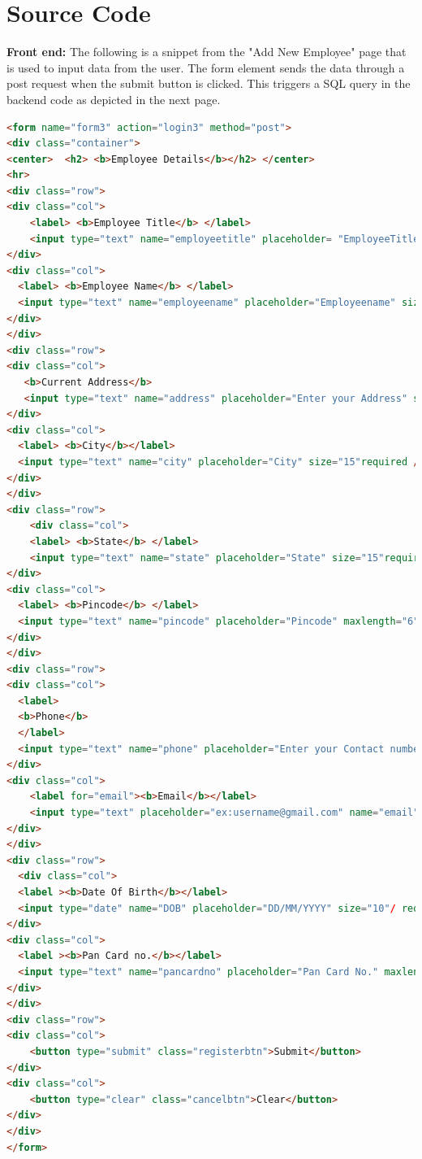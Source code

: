 \documentclass[12pt]{article}
\begin{document}
\section{Source Code}               %
\textbf{Front end:}
\noindent
\newline
The following is a snippet from the "Add New Employee" page that is used to input data from the user. The form element sends the data through a post request when the submit button is clicked. This triggers a SQL query in the backend code as depicted in the next page.
\begin{lstlisting}[language = html]
<form name="form3" action="login3" method="post">  
<div class="container">  
<center>  <h2> <b>Employee Details</b></h2> </center>  
<hr> 
<div class="row">
<div class="col">
    <label> <b>Employee Title</b> </label>   
    <input type="text" name="employeetitle" placeholder= "EmployeeTitle" size="15" required />
</div>
<div class="col">
  <label> <b>Employee Name</b> </label>   
  <input type="text" name="employeename" placeholder="Employeename" size="15" required />   
</div>
</div>
<div class="row">
<div class="col">
   <b>Current Address</b>
   <input type="text" name="address" placeholder="Enter your Address" style="width: 500px;height: 150px;" / required/></input>
</div>
<div class="col">
  <label> <b>City</b></label>    
  <input type="text" name="city" placeholder="City" size="15"required />   
</div>
</div>
<div class="row">
    <div class="col">
    <label> <b>State</b> </label>    
    <input type="text" name="state" placeholder="State" size="15"required /> 
</div>
<div class="col">
  <label> <b>Pincode</b> </label>    
  <input type="text" name="pincode" placeholder="Pincode" maxlength="6" pattern="\d{6}" title="Please enter exactly 7 digits" / required >  
</div>
</div>
<div class="row">
<div class="col">
  <label>   
  <b>Phone</b>  
  </label>  
  <input type="text" name="phone" placeholder="Enter your Contact number"  maxlength="10" pattern="\d{10}" title="Please enter exactly 10 digits" / required>   
</div>
<div class="col">
    <label for="email"><b>Email</b></label>  
    <input type="text" placeholder="ex:username@gmail.com" name="email" required>
</div>
</div>
<div class="row">
  <div class="col">
  <label ><b>Date Of Birth</b></label>
  <input type="date" name="DOB" placeholder="DD/MM/YYYY" size="10"/ required>
</div>
<div class="col">
  <label ><b>Pan Card no.</b></label>
  <input type="text" name="pancardno" placeholder="Pan Card No." maxlength="10" pattern="\d{10}" title="Please enter exactly 10 digits" / required>
</div>
</div> 
<div class="row">
<div class="col">
    <button type="submit" class="registerbtn">Submit</button> 
</div>
<div class="col">
    <button type="clear" class="cancelbtn">Clear</button> 
</div>
</div>
</form> 
\end{lstlisting}
\end{document}
